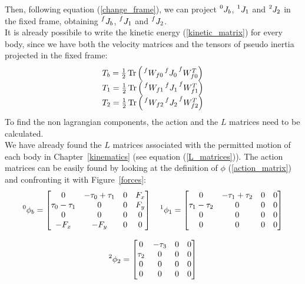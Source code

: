 \documentclass[a4paper,12pt,oneside]{report}
\DeclareMathOperator{\Tr}{Tr}
\begin{document}
Then, following equation (\ref{change_frame}), we can project $\prescript{0}{}{J_b}$, $\prescript{1}{}{J_1}$ and $\prescript{2}{}{J_2}$ in the fixed frame, obtaining $\prescript{f}{}{J_b}$, $\prescript{f}{}{J_1}$ and $\prescript{f}{}{J_2}$.\\
It is already possibile to write the kinetic energy (\ref{kinetic_matrix}) for every body, since we have both the velocity matrices and the tensors of pseudo inertia projected in the fixed frame:
\begin{equation}
  \begin{array}{l}
    T_b=\frac{1}{2}\Tr{\Big(\prescript{f}{}{W_{f0}}\prescript{f}{}{J_0}\prescript{f}{}{W_{f0}^T}\Big)}\\
    T_1=\frac{1}{2}\Tr{\Big(\prescript{f}{}{W_{f1}}\prescript{f}{}{J_1}\prescript{f}{}{W_{f1}^T}\Big)}\\
    T_2=\frac{1}{2}\Tr{\Big(\prescript{f}{}{W_{f2}}\prescript{f}{}{J_2}\prescript{f}{}{W_{f2}^T}\Big)}
  \end{array}
\end{equation}
To find the non lagrangian components, the action and the $L$ matrices need to be calculated.\\
We have already found the $L$ matrices associated with the permitted motion of each body in Chapter~\ref{kinematics} (see equation (\ref{L_matrices})). The action matrices can be easily found by looking at the definition of $\phi$ (\ref{action_matrix}) and confronting it with Figure~\ref{forces}:
\begin{equation}
  \begin{array}{c}
    \prescript{0}{}{\phi_b}=\begin{bmatrix}
      0&-\tau_0+\tau_1&0&F_x\\
      \tau_0-\tau_1&0&0&F_y\\
      0&0&0&0\\
      -F_x&-F_y&0&0
    \end{bmatrix} \quad
    \prescript{1}{}{\phi_1}=\begin{bmatrix}
      0&-\tau_1+\tau_2&0&0\\
      \tau_1-\tau_2&0&0&0\\
      0&0&0&0\\
      0&0&0&0
    \end{bmatrix}\\
    \\
    \prescript{2}{}{\phi_2}=\begin{bmatrix}
      0&-\tau_3&0&0\\
      \tau_2&0&0&0\\
      0&0&0&0\\
      0&0&0&0
    \end{bmatrix}
  \end{array}
\end{equation}
\end{document}
